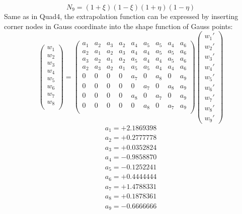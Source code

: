 \begin{equation}
N_9 = \left(1 + \xi \right) \left( 1 - \xi \right)  \left( 1 + \eta \right) \left(1 - \eta \right)
\end{equation}
Same as in Quad4, the extrapolation function can be expressed by inserting corner nodes in Gauss coordinate into the shape function of Gauss points:
\begin{equation}
\begin{pmatrix}
w_1 \\
w_2 \\
w_3 \\
w_4 \\
w_5 \\
w_6 \\
w_7 \\
w_8 \\
\end{pmatrix} = \begin{pmatrix}
a_1 & a_2 &  a_3 &  a_2 & a_4 & a_5 & a_5 & a_4 & a_6       \\[0.3em]
a_2 & a_1 &  a_2 &  a_3 & a_4 & a_4 & a_5 & a_5 & a_6       \\[0.3em]
a_3 & a_2 &  a_1 &  a_2 & a_5 & a_4 & a_4 & a_5 & a_6       \\[0.3em]
a_2 & a_3 &  a_2 &  a_1 & a_5 & a_5 & a_4 & a_4 & a_6       \\[0.3em]
0     & 0    &  0     &  0     & a_7 & 0     & a_8 & 0    & a_9       \\[0.3em]
0     & 0    &  0     &  0     & 0    & a_7 & 0      & a_8 & a_9       \\[0.3em]
0     & 0    &  0     &  0     & a_8 & 0    & a_7 & 0      & a_9       \\[0.3em]
0     & 0    &  0     &  0     & 0     & a_8 & 0 & a_7     & a_9       \\[0.3em]                    
\end{pmatrix} \begin{pmatrix}
{w_1}' \\
{w_2}' \\
{w_3}' \\
{w_4}' \\
{w_5}' \\
{w_6}' \\
{w_7}' \\
{w_8}' \\
{w_9}'
\end{pmatrix}
\end{equation}	
\begin{align*}
a_1 = +2.1869398 \\
a_2 = +0.2777778 \\
a_3 = +0.0352824 \\
a_4 = -0.9858870 \\
a_5 = -0.1252241 \\
a_6 = +0.4444444 \\
a_7 = +1.4788331 \\
a_8 = +0.1878361 \\
a_9 = -0.6666666
\end{align*}

